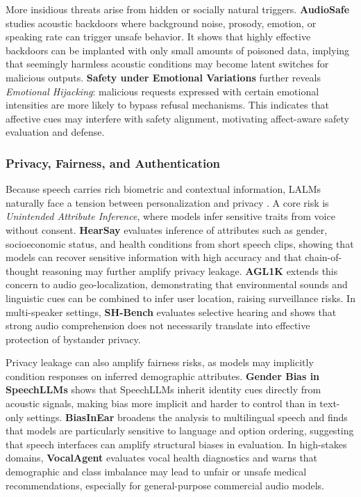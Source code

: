 More insidious threats arise from hidden or socially natural triggers. \textbf{AudioSafe} \cite{lin2025hidden} studies acoustic backdoors where background noise, prosody, emotion, or speaking rate can trigger unsafe behavior. It shows that highly effective backdoors can be implanted with only small amounts of poisoned data, implying that seemingly harmless acoustic conditions may become latent switches for malicious outputs. \textbf{Safety under Emotional Variations} \cite{feng2025investigating} further reveals \textit{Emotional Hijacking}: malicious requests expressed with certain emotional intensities are more likely to bypass refusal mechanisms. This indicates that affective cues may interfere with safety alignment, motivating affect-aware safety evaluation and defense.

\subsubsection{Privacy, Fairness, and Authentication}
\label{sec:5.3.2}

Because speech carries rich biometric and contextual information, LALMs naturally face a tension between personalization and privacy \cite{wang2026voxsafebench}. A core risk is \textit{Unintended Attribute Inference}, where models infer sensitive traits from voice without consent. \textbf{HearSay} \cite{wang2026hearsay} evaluates inference of attributes such as gender, socioeconomic status, and health conditions from short speech clips, showing that models can recover sensitive information with high accuracy and that chain-of-thought reasoning may further amplify privacy leakage. \textbf{AGL1K} \cite{zhang2026sonar} extends this concern to audio geo-localization, demonstrating that environmental sounds and linguistic cues can be combined to infer user location, raising surveillance risks. In multi-speaker settings, \textbf{SH-Bench} \cite{zhan2025protecting} evaluates selective hearing and shows that strong audio comprehension does not necessarily translate into effective protection of bystander privacy.

Privacy leakage can also amplify fairness risks, as models may implicitly condition responses on inferred demographic attributes. \textbf{Gender Bias in SpeechLLMs} \cite{satish2025bias} shows that SpeechLLMs inherit identity cues directly from acoustic signals, making bias more implicit and harder to control than in text-only settings. \textbf{BiasInEar} \cite{wei2026bias} broadens the analysis to multilingual speech and finds that models are particularly sensitive to language and option ordering, suggesting that speech interfaces can amplify structural biases in evaluation. In high-stakes domains, \textbf{VocalAgent} \cite{kim2025vocalagent} evaluates vocal health diagnostics and warns that demographic and class imbalance may lead to unfair or unsafe medical recommendations, especially for general-purpose commercial audio models.

